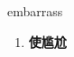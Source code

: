 
\begin{frame}
{\huge embarrass}
\begin{center}
\begin{enumerate}\Large
  \item \textbf{使尴尬}
\end{enumerate}
\end{center}
\end{frame}
